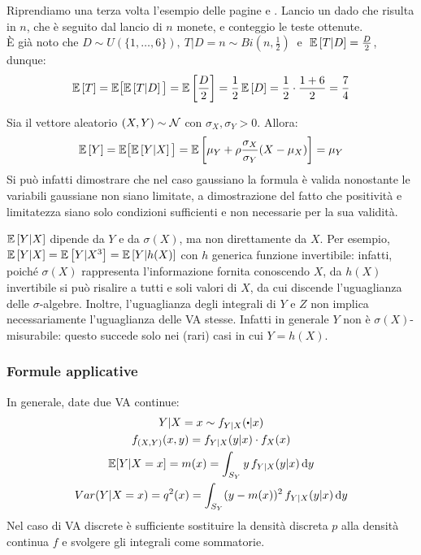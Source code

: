 \medskip
\begin{ese} \label{ese-dadi-monete-teste-3}
  Riprendiamo una terza volta l'esempio delle pagine \pageref{ese-dadi-monete-teste} e \pageref{ese-dadi-monete-teste-2}. Lancio un dado che risulta in $n$, che è seguito dal lancio di $n$ monete, e conteggio le teste ottenute. \\
  È già noto che $D \sim U( \{1,\dots,6\} ), \ T|D=n \sim Bi\left(n, \frac 1 2\right) \ $ e $\ \mathbb E \left[ T|D \right] = \frac D 2$, dunque:
  $$\mathbb E \left[ T \right] = \mathbb E \big[ \mathbb E \left[ T|D \right] \big] = \mathbb E \left[ \frac D 2 \right] = \frac 1 2 \, \mathbb E \left[ D \right] = \frac 1 2 \cdot \frac{1+6}2 = \frac 7 4$$
\end{ese}

\begin{ese}
  Sia il vettore aleatorio $(X,Y) \sim \mathcal N$ con $\sigma_X, \sigma_Y > 0$. Allora:
  $$\mathbb E \left[ Y \right] = \mathbb E \big[ \mathbb E \left[ Y|X \right] \big] = \mathbb E \left[ \mu_Y + \rho \frac{\sigma_X}{\sigma_Y}(X-\mu_X) \right] = \mu_Y$$
  Si può infatti dimostrare che nel caso gaussiano la formula è valida nonostante le variabili gaussiane non siano limitate, a dimostrazione del fatto che positività e limitatezza siano solo condizioni sufficienti e non necessarie per la sua validità.
\end{ese}

\begin{nb}
  $\mathbb E \left[ Y|X \right]$ dipende da $Y$ e da $\sigma(X)$, ma non direttamente da $X$.
  Per esempio, $\mathbb E \left[ Y|X \right] = \mathbb E \left[ Y|X^3 \right] = \mathbb E \left[ Y|h(X) \right]$ con $h$ generica funzione invertibile: infatti, poiché $\sigma(X)$ rappresenta l'informazione fornita conoscendo $X$, da $h(X)$ invertibile si può risalire a tutti e soli valori di $X$, da cui discende l'uguaglianza delle $\sigma$-algebre.
  Inoltre, l'uguaglianza degli integrali di $Y$ e $Z$ non implica necessariamente l'uguaglianza delle VA stesse.
  Infatti in generale $Y$ non è $\sigma(X)$-misurabile: questo succede solo nei (rari) casi in cui $Y = h(X)$.
\end{nb}

\subsubsection{Formule applicative}
In generale, date due VA continue:
\begin{gather*}
  Y|X = x \sim  f_{Y|X}(\bigcdot | x)  \\
  f_{(X, Y)}(x,y) = f_{Y|X}(y|x) \cdot f_X (x) \\
  \EE [Y|X = x] = m(x) = \int_{S_Y} y \, f_{Y|X}(y|x) \, \dy\\
  Var(Y|X = x) = q^2(x) = \int_{S_Y} (y - m(x))^2 \, f_{Y|X}(y|x) \, \dy
\end{gather*}
Nel caso di VA discrete è sufficiente sostituire la densità discreta $p$ alla densità continua $f$ e svolgere gli integrali come sommatorie.

